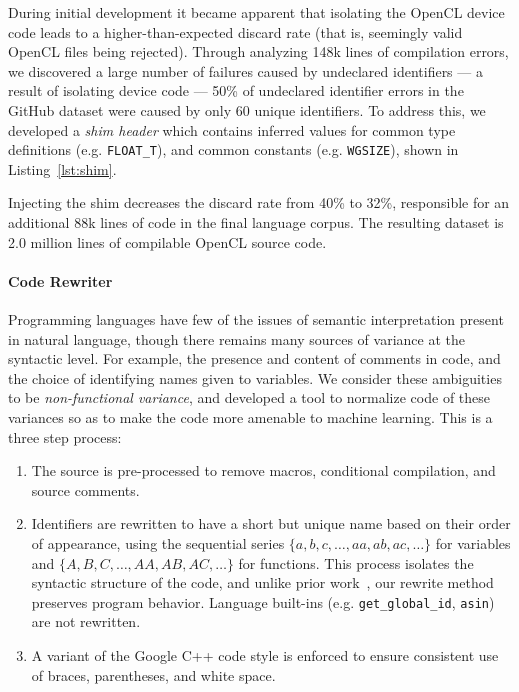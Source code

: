 During initial development it became apparent that isolating the OpenCL device code leads to a higher-than-expected discard rate (that is, seemingly valid OpenCL files being rejected). Through analyzing 148k lines of compilation errors, we discovered a large number of failures caused by undeclared identifiers --- a result of isolating device code --- 50\% of undeclared identifier errors in the GitHub dataset were caused by only 60 unique identifiers. To address this, we developed a \emph{shim header} which contains inferred values for common type definitions (e.g. \texttt{FLOAT\_T}), and common constants (e.g. \texttt{WGSIZE}), shown in Listing~\ref{lst:shim}.

Injecting the shim decreases the discard rate from 40\% to 32\%, responsible for an additional 88k lines of code in the final language corpus. The resulting dataset is 2.0 million lines of compilable OpenCL source code.

\paragraph{Code Rewriter} Programming languages have few of the issues of semantic interpretation present in natural language, though there remains many sources of variance at the syntactic level. For example, the presence and content of comments in code, and the choice of identifying names given to variables. We consider these ambiguities to be \emph{non-functional variance}, and developed a tool to normalize code of these variances so as to make the code more amenable to machine learning. This is a three step process: %
%
\begin{enumerate}
  \item The source is pre-processed to remove macros, conditional compilation, and source comments. %
  \item Identifiers are rewritten to have a short but unique name based on their order of appearance, using the sequential series $\{a,\allowbreak b,\allowbreak c,\allowbreak \ldots,\allowbreak aa,\allowbreak ab,\allowbreak ac,\allowbreak \ldots\}$ for variables and $\{A,\allowbreak B,\allowbreak C,\allowbreak \ldots,\allowbreak AA,\allowbreak AB,\allowbreak AC,\allowbreak \ldots\}$ for functions. This process isolates the syntactic structure of the code, and unlike prior work~\cite{Allamanis2013a}, our rewrite method preserves program behavior. Language built-ins (e.g. \texttt{get\_global\_id}, \texttt{asin}) are not rewritten.%
  \item A variant of the Google C++ code style is enforced to ensure consistent use of braces, parentheses, and white space.
\end{enumerate}


